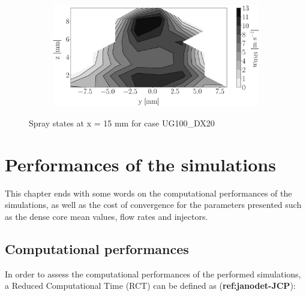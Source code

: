 \begin{figure}[h!]
\begin{subfigure}[b]{0.22\textwidth}
\end{subfigure}
   \hspace{0.17in}
\begin{subfigure}[b]{0.22\textwidth}
	\centering
   \includegraphics[scale=0.17]{./part2_developments/figures_ch5_resolved_JICF/injectors_SLI/uG100_dx20_x15_uz_rms_map.eps}
\end{subfigure}
\caption{Spray states at x = 15 mm for case UG100\_DX20}
\label{fig:injectors_sli_uG100_dx20_x15}
\end{figure}


\clearpage

\section{Performances of the simulations}
\label{subsec:ch5_computational_performances}

This chapter ends with some words on the computational performances of the simulations, as well as the cost of convergence for the parameters presented such as the dense core mean values, flow rates and injectors.

\subsection{Computational performances}

In order to assess the computational performances of the performed simulations, a Reduced Computational Time (RCT) can be defined as (\textbf{ref:janodet-JCP}):

